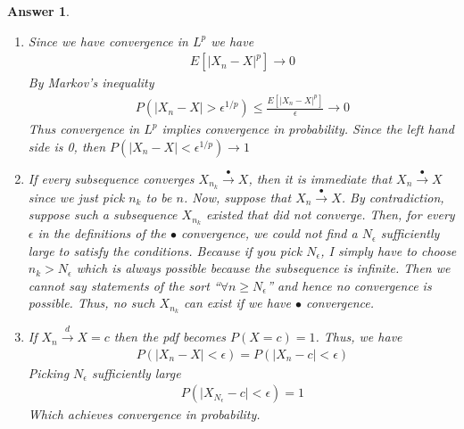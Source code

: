 \documentclass[12pt]{article}
\theoremstyle{colon}
\newtheorem*{answer}{Answer}
\begin{document}
\begin{answer}
  \leavevmode
  \begin{enumerate}[label=\arabic*)]
    \item Since we have convergence in $L^p$ we have
      \begin{gather*}
        E[ \lvert X_n - X \rvert^p ] \rightarrow 0
      \end{gather*}
      By Markov's inequality
      \begin{gather*}
        P( \lvert X_n - X \rvert > \epsilon^{1/p} ) \leq \frac{E[ \lvert X_n - X \rvert^p ]}{\epsilon} \rightarrow 0
      \end{gather*}
      Thus convergence in $L^p$ implies convergence in probability. Since the left hand side is 0, then $P(\lvert X_n - X \rvert < \epsilon^{1/p}) \rightarrow 1$

    \item If every subsequence converges $X_{n_k} \xrightarrow{\bullet} X$, then it is immediate that $X_n \xrightarrow{\bullet} X$ since we just pick $n_k$ to be $n$. Now, suppose that $X_n \xrightarrow{\bullet} X$. By contradiction, suppose such a subsequence $X_{n_k}$ existed that did not converge. Then, for every $\epsilon$ in the definitions of the $\bullet$ convergence, we could not find a $N_\epsilon$ sufficiently large to satisfy the conditions. Because if you pick $N_\epsilon$, I simply have to choose $n_k > N_\epsilon$ which is always possible because the subsequence is infinite. Then we cannot say statements of the sort ``$\forall n \geq N_\epsilon$'' and hence no convergence is possible. Thus, no such $X_{n_k}$ can exist if we have $\bullet$ convergence.

    \item If $X_n \xrightarrow{d} X = c$ then the pdf becomes $P(X = c) = 1$. Thus, we have
      \begin{gather*}
        P( \lvert X_n - X \rvert < \epsilon) = P( \lvert X_n - c \rvert < \epsilon)
      \end{gather*}
      Picking $N_\epsilon$ sufficiently large
      \begin{gather*}
        P( \lvert X_{N_\epsilon} - c \rvert < \epsilon) = 1
      \end{gather*}
      Which achieves convergence in probability.
  \end{enumerate}
\end{answer}

\clearpage
\end{document}
